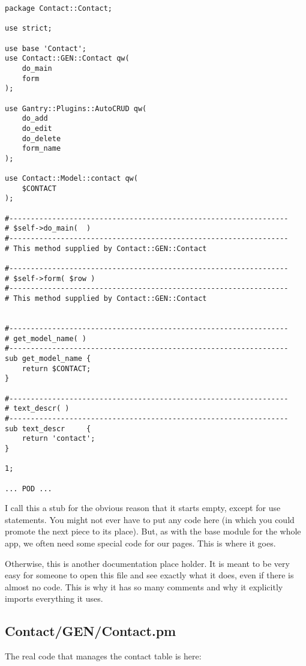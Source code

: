 \begin{verbatim}
package Contact::Contact;

use strict;

use base 'Contact';
use Contact::GEN::Contact qw(
    do_main
    form
);

use Gantry::Plugins::AutoCRUD qw(
    do_add
    do_edit
    do_delete
    form_name
);

use Contact::Model::contact qw(
    $CONTACT
);

#-----------------------------------------------------------------
# $self->do_main(  )
#-----------------------------------------------------------------
# This method supplied by Contact::GEN::Contact

#-----------------------------------------------------------------
# $self->form( $row )
#-----------------------------------------------------------------
# This method supplied by Contact::GEN::Contact


#-----------------------------------------------------------------
# get_model_name( )
#-----------------------------------------------------------------
sub get_model_name {
    return $CONTACT;
}

#-----------------------------------------------------------------
# text_descr( )
#-----------------------------------------------------------------
sub text_descr     {
    return 'contact';
}

1;

... POD ...
\end{verbatim}

I call this a stub for the obvious reason that it starts empty, except
for use statements.  You might not ever have to put any code here (in
which you could promote the next piece to its place).  But, as with the
base module for the whole app, we often need some special code
for our pages.  This is where it goes.

Otherwise, this is another documentation place holder.  It is meant to be
very easy for someone to open this file and see exactly what it does, even
if there is almost no code.  This is why it has so many comments and
why it explicitly imports everything it uses.

\subsection*{Contact/GEN/Contact.pm}

The real code that manages the contact table is here:

